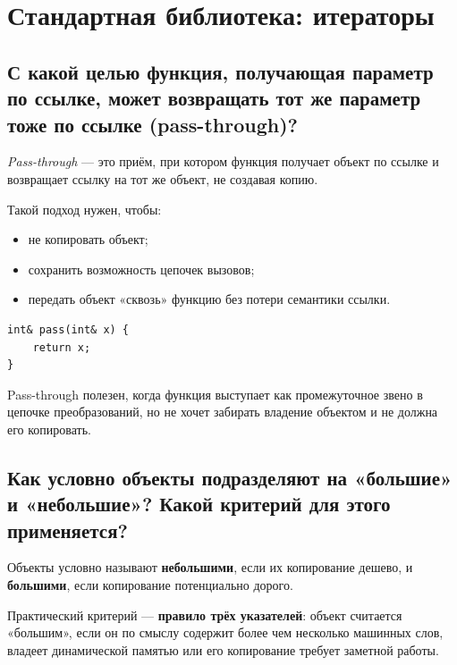 \section{Стандартная библиотека: итераторы}

\subsection{С какой целью функция, получающая параметр по ссылке, может возвращать тот же параметр тоже по ссылке (pass-through)?}
\begin{definition}
\textit{Pass-through} — это приём, при котором функция получает объект по ссылке и возвращает ссылку на тот же объект, не создавая копию.
\end{definition}

Такой подход нужен, чтобы:
\begin{itemize}
    \item не копировать объект;
    \item сохранить возможность цепочек вызовов;
    \item передать объект «сквозь» функцию без потери семантики ссылки.
\end{itemize}

\begin{example}
\begin{verbatim}
int& pass(int& x) {
    return x;
}
\end{verbatim}
\end{example}

\begin{remark}
Pass-through полезен, когда функция выступает как промежуточное звено в цепочке преобразований, но не хочет забирать владение объектом и не должна его копировать.
\end{remark}

\subsection{Как условно объекты подразделяют на «большие» и «небольшие»? Какой критерий для этого применяется?}
\begin{definition}
Объекты условно называют \textbf{небольшими}, если их копирование дешево, и \textbf{большими}, если копирование потенциально дорого.
\end{definition}

Практический критерий — \textbf{правило трёх указателей}: объект считается «большим», если он по смыслу содержит более чем несколько машинных слов, владеет динамической памятью или его копирование требует заметной работы.

